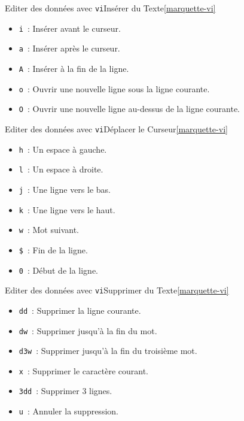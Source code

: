 \documentclass{beamer}
\begin{document}
    \begin{frame}{Editer des données avec \lstinline{vi}}{Insérer du Texte\cref{marquette-vi}}
        \begin{itemize}
            \item \lstinline{i}~: Insérer avant le curseur.
            \item \lstinline{a}~: Insérer après le curseur.
            \item \lstinline{A}~: Insérer à la fin de la ligne.
            \item \lstinline{o}~: Ouvrir une nouvelle ligne sous la ligne courante.
            \item \lstinline{O}~: Ouvrir une nouvelle ligne au-dessus de la ligne courante.
        \end{itemize}
    \end{frame}

    \begin{frame}{Editer des données avec \lstinline{vi}}{Déplacer le Curseur\cref{marquette-vi}}
        \begin{itemize}
            \item \lstinline{h}~: Un espace à gauche.
            \item \lstinline{l}~: Un espace à droite.
            \item \lstinline{j}~: Une ligne vers le bas.
            \item \lstinline{k}~: Une ligne vers le haut.
            \item \lstinline{w}~: Mot suivant.
            \item \lstinline{$}~: Fin de la ligne.
            \item \lstinline{0}~: Début de la ligne.
        \end{itemize}
    \end{frame}

    \begin{frame}{Editer des données avec \lstinline{vi}}{Supprimer du Texte\cref{marquette-vi}}
        \begin{itemize}
            \item \lstinline{dd}~: Supprimer la ligne courante.
            \item \lstinline{dw}~: Supprimer jusqu'à la fin du mot.
            \item \lstinline{d3w}~: Supprimer jusqu'à la fin du troisième mot.
            \item \lstinline{x}~: Supprimer le caractère courant.
            \item \lstinline{3dd}~: Supprimer 3 lignes.
            \item \lstinline{u}~: Annuler la suppression.
        \end{itemize}
    \end{frame}
\end{document}
